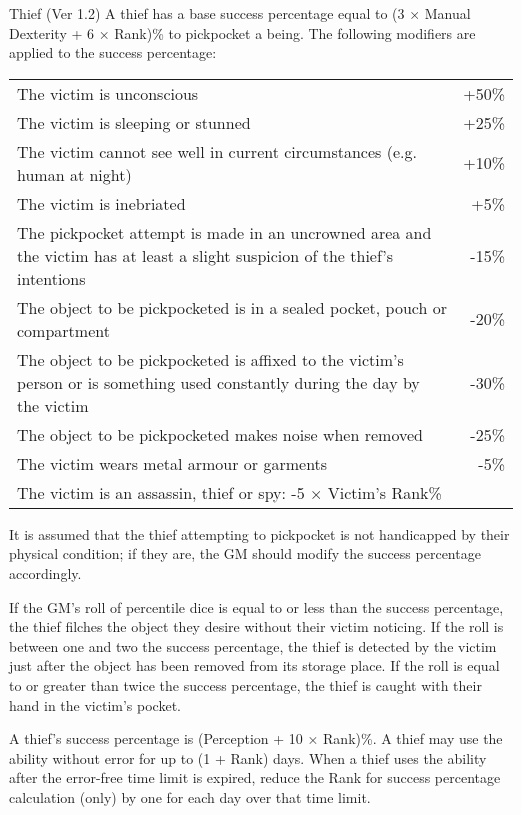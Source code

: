 \begin{Chapter}{Thief (Ver 1.2)}
A thief has a base success percentage equal to (3 × Manual Dexterity +
6 × Rank)\% to pickpocket a being.  The following modifiers are
applied to the success percentage:

\begin{tabularx}{\columnwidth}{Xr}
The victim is unconscious		& +50\% \\
The victim is sleeping or stunned	& +25\% \\
The victim cannot see well in current circumstances (e.g. human at night)	& +10\% \\
The victim is inebriated		& +5\% \\
The pickpocket attempt is made in an uncrowned area and the victim has at least a slight suspicion of the thief’s intentions	& -15\% \\
The object to be pickpocketed is in a sealed pocket, pouch or compartment	& -20\% \\
The object to be pickpocketed is affixed to the victim’s person or is something used constantly during the day by the victim	& -30\% \\
The object to be pickpocketed makes noise when removed	& -25\% \\
The victim wears metal armour or garments	& -5\% \\
The victim is an assassin, thief or spy: -5 × Victim’s Rank\%	& \\
\end{tabularx}

It is assumed that the thief attempting to pickpocket is not
handicapped by their physical condition; if they are, the GM should
modify the success percentage accordingly.

If the GM’s roll of percentile dice is equal to or less than the
success percentage, the thief filches the object they desire without
their victim noticing.  If the roll is between one and two the success
percentage, the thief is detected by the victim just after the object
has been removed from its storage place.  If the roll is equal to or
greater than twice the success percentage, the thief is caught with
their hand in the victim’s pocket.


A thief’s success percentage is (Perception + 10 × Rank)\%.  A thief
may use the ability without error for up to (1 + Rank) days.  When a
thief uses the ability after the error-free time limit is expired,
reduce the Rank for success percentage calculation (only) by one for
each day over that time limit.


\end{Chapter}
